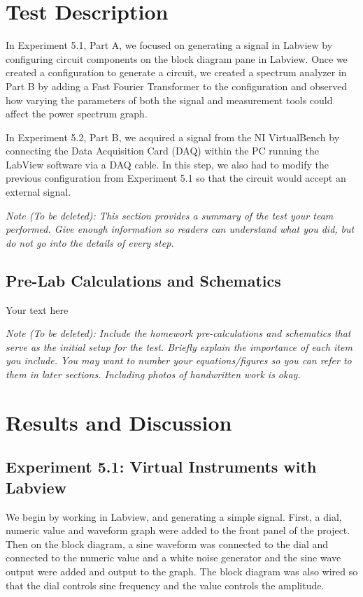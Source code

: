 \documentclass[10pt]{article}
\begin{document}
\medskip


\section{Test Description}

In Experiment 5.1, Part A, we focused on generating a signal in Labview by configuring circuit components on the block diagram pane in Labview. Once we created a configuration to generate a circuit, we created a spectrum analyzer in Part B by adding a Fast Fourier Transformer to the configuration and observed how varying the parameters of both the signal and measurement tools could affect the power spectrum graph. 

In Experiment 5.2, Part B, we acquired a signal from the NI VirtualBench by connecting the Data Acquisition Card (DAQ) within the PC running the LabView software via a DAQ cable. In this step, we also had to modify the previous configuration from Experiment 5.1 so that the circuit would accept an external signal. 

\medskip

\textit{Note (To be deleted): This section provides a summary of the test your team performed. Give enough information so readers can understand what you did, but do not go into the details of every step.}

\subsection{Pre-Lab Calculations and Schematics}

Your text here

\medskip

\textit{Note (To be deleted): Include the homework pre-calculations and schematics that serve as the initial setup for the test. Briefly explain the importance of each item you include. You may want to number your equations/figures so you can refer to them in later sections. Including photos of handwritten work is okay.}

\section{Results and Discussion}

\subsection{Experiment 5.1: Virtual Instruments with Labview }
\qquad We begin by working in Labview, and generating a simple signal. First, a dial, numeric value and waveform graph were added to the front panel of the project. Then on the block diagram, a sine waveform was connected to the dial and connected to the numeric value and a white noise generator and the sine wave output were added and output to the graph. The block diagram was also wired so that the dial controls sine frequency and the value controls the amplitude. 
\end{document}
